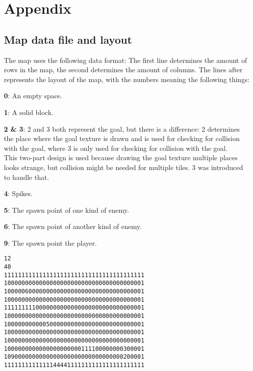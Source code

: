 \section{Appendix}
\label{06}

\subsection{Map data file and layout}
\label{06_01}

The map uses the following data format: The first line determines the amount of rows in the map, the second determines the amount of columns. The lines after represents the layout of the map, with the numbers meaning the following things:

\begin{my_itemize}

	\item \textbf{0}: An empty space.

	\item \textbf{1}: A solid block.

	\item \textbf{2 \& 3}: 2 and 3 both represent the goal, but there is a difference: 2 determines the place where the goal texture is drawn and is used for checking for collision with the goal, where 3 is only used for checking for collision with the goal. 
		\\This two-part design is used because drawing the goal texture multiple places looks strange, but collision might be needed for multiple tiles. 3 was introduced to handle that.

	\item \textbf{4}: Spikes.

	\item \textbf{5}: The spawn point of one kind of enemy.

	\item \textbf{6}: The spawn point of another kind of enemy.

	\item \textbf{9}: The spawn point the player.

\end{my_itemize}

\begin{lstlisting}
12
40
1111111111111111111111111111111111111111
1000000000000000000000000000000000000001
1000006000000000000000000000000000000001
1000000000000000000000000000000000000001
1111111110000000000000000000000000000001
1000000000000000000000000000000000000001
1000000000005000000000000000000000000001
1000000000000000000000000000000000000001
1000000000000000000000000000000000000001
1000000000000000000000111100000000300001
1090000000000000000000000000000000200001
1111111111111144441111111111111111111111
\end{lstlisting}





